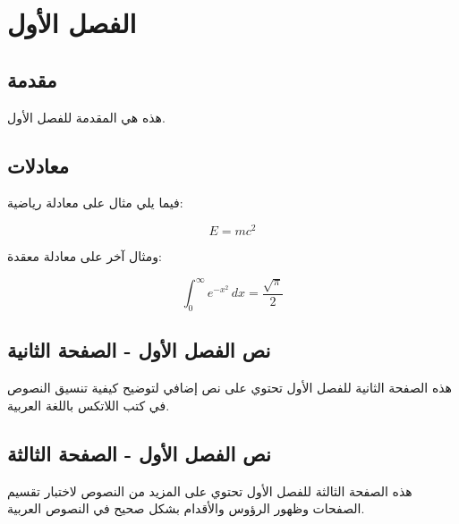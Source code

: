 
\chapter{الفصل الأول}

\section{مقدمة}
هذه هي المقدمة للفصل الأول.

\section{معادلات}
فيما يلي مثال على معادلة رياضية:

\begin{equation}
E = mc^2
\end{equation}

ومثال آخر على معادلة معقدة:

\begin{equation}
\int_0^\infty e^{-x^2} \, dx = \frac{\sqrt{\pi}}{2}
\end{equation}

\newpage

\section{نص الفصل الأول - الصفحة الثانية}

هذه الصفحة الثانية للفصل الأول تحتوي على نص إضافي لتوضيح كيفية تنسيق النصوص في كتب اللاتكس باللغة العربية.

\newpage

\section{نص الفصل الأول - الصفحة الثالثة}

هذه الصفحة الثالثة للفصل الأول تحتوي على المزيد من النصوص لاختبار تقسيم الصفحات وظهور الرؤوس والأقدام بشكل صحيح في النصوص العربية.
